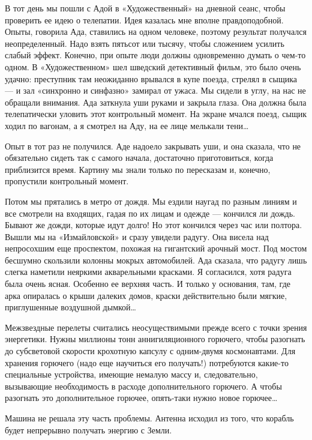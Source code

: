В тот день  мы пошли  с Адой в  «Художественный» на  дневной сеанс,  чтобы
проверить ее идею  о телепатии. Идея  казалась мне вполне  правдоподобной.
Опыты, говорила  Ада,  ставились  на  одном  человеке,  поэтому  результат
получался неопределенный. Надо взять  пятьсот или тысячу, чтобы  сложением
усилить слабый эффект. Конечно, при опыте люди должны одновременно  думать
о чем-то одном.  В «Художественном»  шел шведский  детективный фильм,  это
было очень  удачно:  преступник там  неожиданно  врывался в  купе  поезда,
стрелял в  сыщика —  и зал  «синхронно и  синфазно» замирал  от ужаса.  Мы
сидели в углу,  на нас  не обращали внимания.  Ада заткнула  уши руками  и
закрыла глаза.  Она должна  была  телепатически уловить  этот  контрольный
момент. На экране  мчался поезд, сыщик  ходил по вагонам,  а я смотрел  на
Аду, на ее лице мелькали тени…

Опыт в тот раз не получился. Аде надоело закрывать уши, и она сказала, что
не обязательно сидеть так с самого начала, достаточно приготовиться, когда
приблизится время.  Картину  мы знали  только  по пересказам  и,  конечно,
пропустили контрольный момент.

Потом мы прятались в метро от дождя.  Мы ездили наугад по разным линиям  и
все смотрели на входящих, гадая по их лицам и одежде — кончился ли  дождь.
Бывают же  дожди, которые  идут  долго! Но  этот  кончился через  час  или
полтора. Вышли мы на «Измайловской» и сразу увидели радугу. Она висела над
непросохшим еще проспектом, похожая на гигантский арочный мост. Под мостом
бесшумно скользили  колонны мокрых  автомобилей. Ада  сказала, что  радугу
лишь слегка наметили  неяркими акварельными красками.  Я согласился,  хотя
радуга была очень ясная. Особенно ее верхняя часть. И только у  основания,
там, где арка опиралась о  крыши далеких домов, краски действительно  были
мягкие, приглушенные воздушной дымкой…

Межзвездные перелеты считались неосуществимыми прежде всего с точки зрения
энергетики. Нужны миллионы тонн аннигиляционного горючего, чтобы разогнать
до субсветовой скорости крохотную капсулу с одним-двумя космонавтами.  Для
хранения горючего (надо еще научиться его получать!) потребуются  какие-то
специальные устройства, имеющие немалую массу и, следовательно, вызывающие
необходимость в расходе  дополнительного горючего. А  чтобы разогнать  это
дополнительное горючее, опять-таки нужно новое горючее…

Машина не решала эту часть проблемы. Антенна исходил из того, что  корабль
будет непрерывно получать энергию с Земли.

